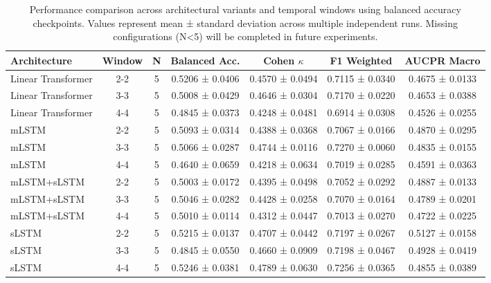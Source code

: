 \begin{table}[htbp]
\centering
\footnotesize
\caption{Performance comparison across architectural variants and temporal windows using balanced accuracy checkpoints. Values represent mean ± standard deviation across multiple independent runs. Missing configurations (N<5) will be completed in future experiments.}
\label{tab:metrics_bal_acc_complete}
\begin{tabular}{l | c | c | c | c | c | c}
\hline
\textbf{Architecture} & \textbf{Window} & \textbf{N} & \textbf{Balanced Acc.} & \textbf{Cohen $\kappa$} & \textbf{F1 Weighted} & \textbf{AUCPR Macro} \\
\hline
Linear Transformer & 2-2 & 5 & 0.5206 ± 0.0406 & 0.4570 ± 0.0494 & 0.7115 ± 0.0340 & 0.4675 ± 0.0133 \\
Linear Transformer & 3-3 & 5 & 0.5008 ± 0.0429 & 0.4646 ± 0.0304 & 0.7170 ± 0.0220 & 0.4653 ± 0.0388 \\
Linear Transformer & 4-4 & 5 & 0.4845 ± 0.0373 & 0.4248 ± 0.0481 & 0.6914 ± 0.0308 & 0.4526 ± 0.0255 \\
\hline
mLSTM & 2-2 & 5 & 0.5093 ± 0.0314 & 0.4388 ± 0.0368 & 0.7067 ± 0.0166 & 0.4870 ± 0.0295 \\
mLSTM & 3-3 & 5 & 0.5066 ± 0.0287 & 0.4744 ± 0.0116 & 0.7270 ± 0.0060 & 0.4835 ± 0.0155 \\
mLSTM & 4-4 & 5 & 0.4640 ± 0.0659 & 0.4218 ± 0.0634 & 0.7019 ± 0.0285 & 0.4591 ± 0.0363 \\
\hline
mLSTM+sLSTM & 2-2 & 5 & 0.5003 ± 0.0172 & 0.4395 ± 0.0498 & 0.7052 ± 0.0292 & 0.4887 ± 0.0133 \\
mLSTM+sLSTM & 3-3 & 5 & 0.5046 ± 0.0282 & 0.4428 ± 0.0258 & 0.7070 ± 0.0164 & 0.4789 ± 0.0201 \\
mLSTM+sLSTM & 4-4 & 5 & 0.5010 ± 0.0114 & 0.4312 ± 0.0447 & 0.7013 ± 0.0270 & 0.4722 ± 0.0225 \\
\hline
sLSTM & 2-2 & 5 & 0.5215 ± 0.0137 & 0.4707 ± 0.0442 & 0.7197 ± 0.0267 & 0.5127 ± 0.0158 \\
sLSTM & 3-3 & 5 & 0.4845 ± 0.0550 & 0.4660 ± 0.0909 & 0.7198 ± 0.0467 & 0.4928 ± 0.0419 \\
sLSTM & 4-4 & 5 & 0.5246 ± 0.0381 & 0.4789 ± 0.0630 & 0.7256 ± 0.0365 & 0.4855 ± 0.0389 \\
\hline
\end{tabular}
\end{table}